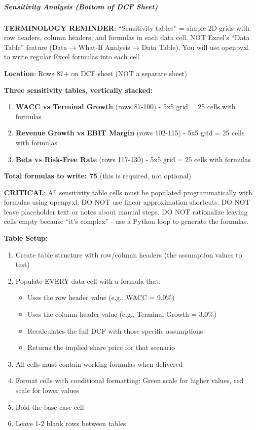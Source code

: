 \documentclass[11pt]{article}
\begin{document}
\subparagraph{Sensitivity Analysis (Bottom of DCF Sheet)}\mbox{}\par

\textbf{TERMINOLOGY REMINDER}: ``Sensitivity tables'' = simple 2D grids with row headers, column headers, and formulas in each data cell. NOT Excel's ``Data Table'' feature (Data → What-If Analysis → Data Table). You will use openpyxl to write regular Excel formulas into each cell.


\textbf{Location}: Rows 87+ on DCF sheet (NOT a separate sheet)


\textbf{Three sensitivity tables, vertically stacked:}


\begin{enumerate}[leftmargin=*,itemsep=2pt,topsep=2pt]
\item {} \textbf{WACC vs Terminal Growth} (rows 87-100) - 5x5 grid = 25 cells with formulas
\item {} \textbf{Revenue Growth vs EBIT Margin} (rows 102-115) - 5x5 grid = 25 cells with formulas
\item {} \textbf{Beta vs Risk-Free Rate} (rows 117-130) - 5x5 grid = 25 cells with formulas
\end{enumerate}

\textbf{Total formulas to write: 75} (this is required, not optional)


\textbf{CRITICAL}: All sensitivity table cells must be populated programmatically with formulas using openpyxl. DO NOT use linear approximation shortcuts. DO NOT leave placeholder text or notes about manual steps. DO NOT rationalize leaving cells empty because ``it's complex'' - use a Python loop to generate the formulas.


\textbf{Table Setup:}

\begin{enumerate}[leftmargin=*,itemsep=2pt,topsep=2pt]
\item {} Create table structure with row/column headers (the assumption values to test)
\item {} Populate EVERY data cell with a formula that:
\begin{itemize}[leftmargin=*,itemsep=2pt,topsep=2pt]
\item {} Uses the row header value (e.g., WACC = 9.0\%)
\item {} Uses the column header value (e.g., Terminal Growth = 3.0\%)
\item {} Recalculates the full DCF with those specific assumptions
\item {} Returns the implied share price for that scenario
\end{itemize}
\item {} All cells must contain working formulas when delivered
\item {} Format cells with conditional formatting: Green scale for higher values, red scale for lower values
\item {} Bold the base case cell
\item {} Leave 1-2 blank rows between tables
\end{enumerate}
\end{document}
